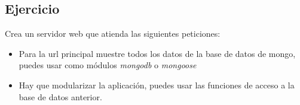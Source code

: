 \documentclass[4paper]{article}
\begin{document}
\subsection{Ejercicio}
Crea un servidor web que atienda las siguientes peticiones:
\begin{itemize}
\item Para la url principal muestre todos los datos de la base de datos de mongo, puedes usar como módulos \emph{mongodb} o \emph{mongoose}
\item Hay que modularizar la aplicación, puedes usar las funciones de acceso a la base de datos anterior.
\end{itemize}
\end{document}
